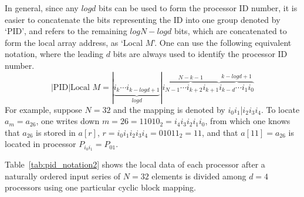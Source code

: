 \documentclass[submission]{iacrtrans}
\theoremstyle{plain}
\begin{document}
In general, since any $logd$ bits can be used to form the processor ID number, it is easier to concatenate the bits representing the ID into one group denoted by `PID', and refers to the remaining $logN-logd$ bits, which are concatenated to form the local array address, as `Local $M$'. One can use the following equivalent notation, where the leading $d$ bits are always used to identify the processor ID number.
\[
  |\text{PID}|\text{Local } M = |\underbrace{i_k\cdots i_{k-logd+1}}_{logd}|\overbrace{i_{N-1}\cdots i_{k+2}i_{k+1}}^{N-k-1}\overbrace{i_{k-d}\cdots i_1i_0}^{k-logd+1}
\]
For example, suppose $N=32$ and the mapping is denoted by $i_0i_1$|$i_2i_3i_4$. To locate $a_m=a_{26}$, one writes down $m=26=11010_2=i_4i_3i_2i_1i_0$, from which one knows that $a_{26}$ is stored in $a[r]$, $r=i_0i_1i_2i_3i_4=01011_2=11$, and that $a[11]=a_{26}$ is located in processor $P_{i_0i_1}=P_{01}$.

Table~\ref{tab:pid_notation2} shows the local data of each processor after a naturally ordered input series of $N=32$ elements is divided among $d=4$ processors using one particular cyclic block mapping.
\end{document}
